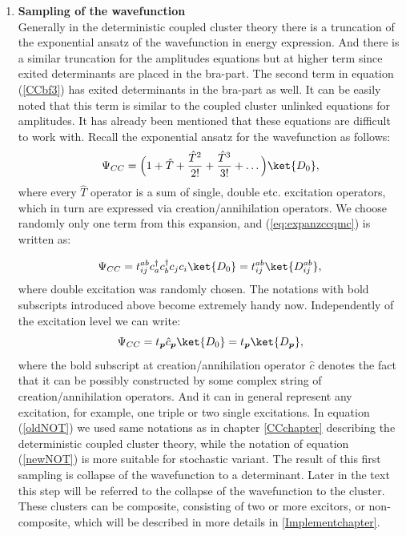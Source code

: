\documentclass[twoside,english]{uiofysmaster}
\begin{document}
\begin{enumerate}
	\item
	\textbf{Sampling of the wavefunction}\\ Generally in the deterministic coupled cluster theory there is a truncation of the exponential ansatz of the wavefunction in energy expression. And there is a similar truncation for the amplitudes equations but at higher term since exited determinants are placed in the bra-part. The second term in equation (\ref{CCbf3}) has exited determinants in the bra-part as well. It can be easily noted that this term is similar to the coupled cluster unlinked equations for amplitudes. It has already been mentioned that these equations are difficult to work with. Recall the exponential ansatz for the wavefunction as follows:
	\begin{equation}\label{eq:expanzccqmc}
	\Psi_{CC} = \Big(1 + \hat{T} + \frac{\hat{T}^2}{2!} + \frac{\hat{T}^3}{3!} + \dots \Big)\ket{D_0},
	\end{equation}	
	where every $\hat{T}$ operator is a sum of single, double etc. excitation operators, which in turn are expressed via creation/annihilation operators. We choose randomly only one term from this expansion, and (\ref{eq:expanzccqmc}) is written as:
	
	\begin{equation}\label{oldNOT}
			\Psi_{CC} = t_{ij}^{ab} c^\dag_{a} c^\dag_{b} c_{j} c_{i}\ket{D_0} = t_{ij}^{ab} \ket{D_{ij}^{ab}},
	\end{equation}
	where double excitation was randomly chosen. The notations with bold subscripts introduced above become extremely handy now. Independently of the excitation level we can write: 
	\begin{equation}\label{newNOT}
	\Psi_{CC} = t_{\boldsymbol{p}} \hat{c}_{\boldsymbol{p}}\ket{D_0} = t_{\boldsymbol{p}} \ket{D_{\boldsymbol{p}}},
	\end{equation}	
	where the bold subscript at creation/annihilation operator $\hat{c}$ denotes the fact that it can be possibly constructed by some complex string of creation/annihilation operators. And it can in general represent any excitation, for example, one triple or two single excitations. In equation (\ref{oldNOT}) we used same notations as in chapter \ref{CCchapter} describing the deterministic coupled cluster theory, while the notation of equation (\ref{newNOT}) is more suitable for stochastic variant.
The result of this first sampling is collapse of the wavefunction to a determinant.%
Later in the text this step will be referred to the collapse of the wavefunction to the cluster. These clusters can be composite, consisting of two or more excitors, or non-composite, which will be described in more details in \autoref{Implementchapter}.
	

\end{enumerate}
\end{document}

